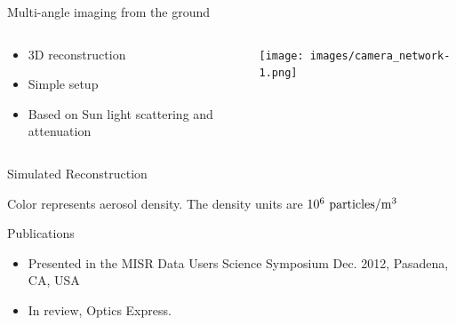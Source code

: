 \documentclass[compress,red,12pt]{beamer}
\begin{document}
\begin{frame}{Multi-angle imaging from the ground}
  \begin{columns}[T]
    \begin{column}{.5\textwidth}
      \begin{itemize}
      \item 3D reconstruction
      \item Simple setup
      \item Based on Sun light scattering and attenuation
      \end{itemize}
    \end{column}
    \begin{column}{.5\textwidth}
      \centering
      {\texttt{[image: images/camera\_network-1.png]}}
    \end{column}
  \end{columns}
\end{frame}


\begin{frame}{Simulated Reconstruction}
  \begin{center}
  \end{center}
  \begin{center}
    \tiny{Color represents aerosol density. The density units are $10^{6}~{\rm particles}/{\rm m}^3$}
  \end{center}
\end{frame}


\begin{frame}{}
\end{frame}


\begin{frame}{}
  \begin{center}
    \begin{block}{Publications}
      \begin{itemize}
      \item Presented in the MISR Data Users Science Symposium Dec. 2012, Pasadena, CA, USA
      \item In review, Optics Express.
      \end{itemize}
    \end{block}
  \end{center}
\end{frame}
\end{document}
